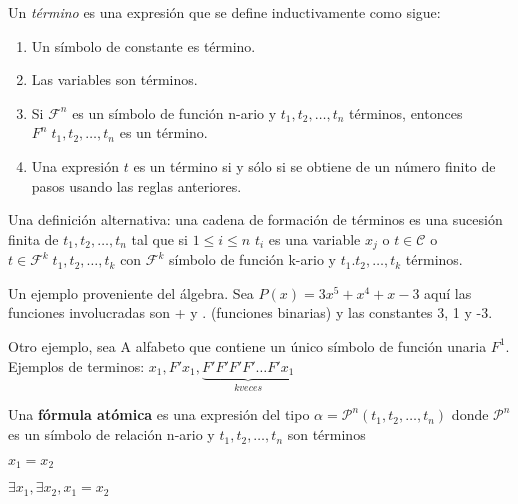 \begin{definition}

Un \textit{t\'ermino} es una expresi\'on que se define inductivamente como sigue:

\begin{enumerate}
	\item Un s\'imbolo de constante es t\'ermino.
	\item Las variables son t\'erminos.
	\item Si $\mathcal{F}^n$ es un s\'imbolo de funci\'on n-ario y $t_1, t_2, \ldots, t_n$ t\'erminos, entonces
	$F^n \; t_1, t_2, \ldots, t_n$ es un t\'ermino.
	\item Una expresi\'on $t$ es un t\'ermino si y s\'olo si se obtiene de un n\'umero finito de pasos usando las reglas anteriores.
\end{enumerate}

\end{definition}

Una definici\'on alternativa: una cadena de formaci\'on de t\'erminos es una sucesi\'on finita de $t_1, t_2, \ldots, t_n$ tal que si $1 \leq i \leq n$ $t_i$ es una variable $x_j$ o $t \in \mathcal{C}$ o $t \in \mathcal{F}^k \; t_1, t_2, \ldots, t_k$ con $\mathcal{F}^k$ s\'imbolo de funci\'on k-ario y $t_1. t_2, \ldots, t_k$ t\'erminos.

\begin{example}

Un ejemplo proveniente del \'algebra. Sea $P(x) = 3x^5 + x^4 + x - 3$ aqu\'i las funciones involucradas son + y . (funciones binarias) y las constantes 3, 1 y -3.

Otro ejemplo, sea A alfabeto que contiene un \'unico s\'imbolo de funci\'on unaria $F^1$. Ejemplos de terminos: $x_1, F'x_1, \underbrace{F'F'F'F' \ldots F'x_1}_{k veces}$

\end{example}

\begin{definition}

Una \textbf{f\'ormula at\'omica} es una expresi\'on del tipo $\alpha = \mathcal{P}^n(t_1, t_2, \ldots, t_n)$ donde $\mathcal{P}^n$ es un s\'imbolo de relaci\'on n-ario y $t_1, t_2, \ldots, t_n$ son t\'erminos

\end{definition}

\begin{example}

$x_1 = x_2$

$\exists x_1, \exists x_2, x_1 = x_2$


\end{example}

